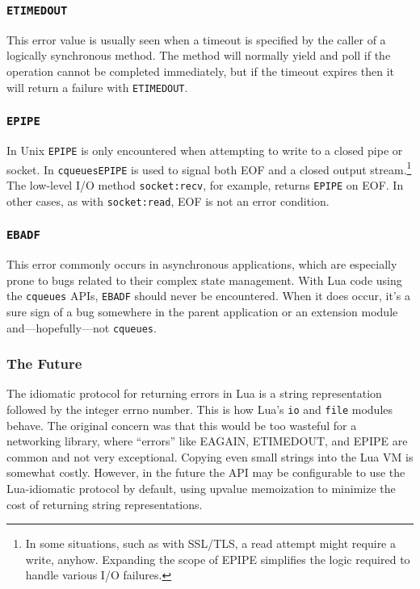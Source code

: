 \documentclass[11pt, oneside]{memoir}
\newcommand*{\cqueues}[0]{\texttt{cqueues}\xspace}
\newcommand*{\fn}[1]{\texttt{#1}\xspace}
\newcommand*{\method}[1]{\texttt{#1}\xspace}
\newcommand*{\errno}[1]{\texttt{#1}\xspace}
\begin{document}
\subsubsection{\texttt{ETIMEDOUT}}

This error value is usually seen when a timeout is specified by the caller of a logically synchronous method. The method will normally yield and poll if the operation cannot be completed immediately, but if the timeout expires then it will return a failure with \errno{ETIMEDOUT}.

\subsubsection{\texttt{EPIPE}}

In Unix \errno{EPIPE} is only encountered when attempting to write to a closed pipe or socket. In \cqueues \errno{EPIPE} is used to signal both EOF and a closed output stream.\footnote{In some situations, such as with SSL/TLS, a read attempt might require a write, anyhow. Expanding the scope of EPIPE simplifies the logic required to handle various I/O failures.} The low-level I/O method \method{socket:recv}, for example, returns \errno{EPIPE} on EOF. In other cases, as with \method{socket:read}, EOF is not an error condition.

\subsubsection{\texttt{EBADF}}

This error commonly occurs in asynchronous applications, which are especially prone to bugs related to their complex state management. With Lua code using the \cqueues APIs, \errno{EBADF} should never be encountered. When it does occur, it's a sure sign of a bug somewhere in the parent application or an extension module and---hopefully---not \cqueues.

\subsubsection{The Future}

The idiomatic protocol for returning errors in Lua is a string representation followed by the integer errno number. This is how Lua's \fn{io} and \fn{file} modules behave. The original concern was that this would be too wasteful for a networking library, where ``errors'' like EAGAIN, ETIMEDOUT, and EPIPE are common and not very exceptional. Copying even small strings into the Lua VM is somewhat costly. However, in the future the API may be configurable to use the Lua-idiomatic protocol by default, using upvalue memoization to minimize the cost of returning string representations.
\end{document}
